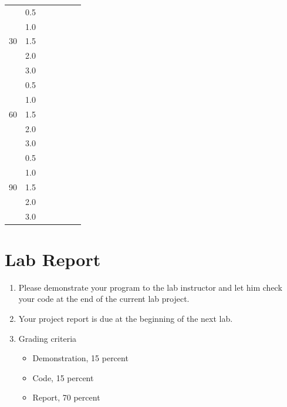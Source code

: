 \documentclass[letterpaper,12pt]{article}
\begin{document}
\begin{enumerate}
\begin{table}[H]
\begin{center}
\begin{tabular}{|c|c|c|c|c|c|c|}
                \multirow{5}{*}{30} & 0.5 & & & & & \\ \cline{2-7}
                & 1.0 & & & & & \\ \cline{2-7}
                & 1.5 & & & & & \\ \cline{2-7}
                & 2.0 & & & & & \\ \cline{2-7}
                & 3.0 & & & & & \\ \hline
                \multirow{5}{*}{60} & 0.5 & & & & & \\ \cline{2-7}
                & 1.0 & & & & & \\ \cline{2-7}
                & 1.5 & & & & & \\ \cline{2-7}
                & 2.0 & & & & & \\ \cline{2-7}
                & 3.0 & & & & & \\ \hline
                \multirow{5}{*}{90} & 0.5 & & & & & \\ \cline{2-7}
                & 1.0 & & & & & \\ \cline{2-7}
                & 1.5 & & & & & \\ \cline{2-7}
                & 2.0 & & & & & \\ \cline{2-7}
                & 3.0 & & & & & \\ \hline
            \end{tabular}
        \end{center}
        \end{table}
\end{enumerate}
\section*{Lab Report}
\begin{enumerate}
   \item Please demonstrate your program to the lab instructor and let him check your code at the end of the current lab project.
   \item Your project report is due at the beginning of the next lab.
   \item Grading criteria
      \begin{itemize}
         \item Demonstration, 15 percent
         \item Code, 15 percent
         \item Report, 70 percent
      \end{itemize}
\end{enumerate}
\end{document}
